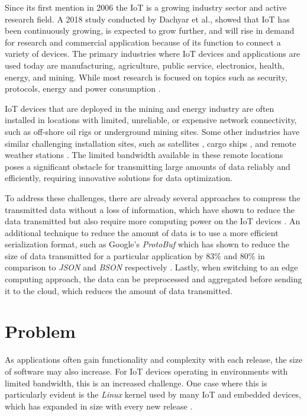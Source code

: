 Since its first mention in 2006 \cite{Adelmann2006ToolkitFB} the \ac{IoT}
is a growing industry sector and active research field. A 2018 study conducted
by Dachyar et al., showed that \ac{IoT} has been continuously growing, is expected
to grow further, and will rise in demand for research and commercial application
because of its function to connect a variety of devices. The primary industries
where \ac{IoT} devices and applications are used today are manufacturing,
agriculture, public service, electronics, health, energy, and mining.
While most research is focused on topics such as security, protocols, energy and
power consumption \cite{dachyar2019knowledge}.

\ac{IoT} devices that are deployed in the mining and energy industry are often
installed in locations with limited, unreliable, or expensive network
connectivity, such as off-shore oil rigs or underground mining sites.
Some other industries have similar challenging installation sites, such as
satellites \cite{electronics8111247}, cargo ships \cite{9090272}, and remote weather stations \cite{info12040146}.
The limited bandwidth available in these remote locations poses a significant
obstacle for transmitting large amounts of data reliably and efficiently,
requiring innovative solutions for data optimization.

To address these challenges, there are already several approaches to compress
the transmitted data without a loss of information, which have shown to reduce
the data transmitted but also require more computing power on the \ac{IoT}
devices \cite{9243457}. An additional technique to reduce the amount of data
is to use a more efficient serialization format, such as Google's \textit{ProtoBuf}
which has shown to reduce the size of data transmitted for a particular application
by 83\% and 80\% in comparison to \textit{JSON} and \textit{BSON} respectively \cite{7765670}.
Lastly, when switching to an edge computing approach, the data can be preprocessed
and aggregated before sending it to the cloud, which reduces the amount of data
transmitted.


\section{Problem}
As applications often gain functionality and complexity with each release, the
size of software may also increase. For \ac{IoT} devices operating in environments
with limited bandwidth, this is an increased challenge. One case where this is
particularly evident is the \textit{Linux} kernel used by many \ac{IoT} and embedded
devices, which has expanded in size with every new release \cite{linux-kernel-report}.

